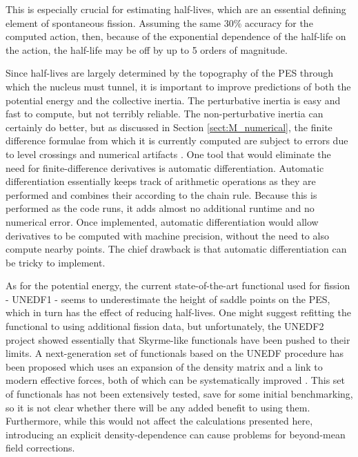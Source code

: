This is especially crucial for estimating half-lives, which are an essential defining element of spontaneous fission. Assuming the same 30\% accuracy for the computed action, then, because of the exponential dependence of the half-life on the action, the half-life may be off by up to 5 orders of magnitude.



Since half-lives are largely determined by the topography of the PES through which the nucleus must tunnel, it is important to improve predictions of both the potential energy and the collective inertia. The perturbative inertia is easy and fast to compute, but not terribly reliable. The non-perturbative inertia can certainly do better, but as discussed in Section \ref{sect:M_numerical}, the finite difference formulae from which it is currently computed are subject to errors due to level crossings and numerical artifacts . One tool that would eliminate the need for finite-difference derivatives is automatic differentiation. Automatic differentiation essentially keeps track of arithmetic operations as they are performed and combines their according to the chain rule. Because this is performed as the code runs, it adds almost no additional runtime and no numerical error. Once implemented, automatic differentiation would allow derivatives to be computed with machine precision, without the need to also compute nearby points. The chief drawback is that automatic differentiation can be tricky to implement.

As for the potential energy, the current state-of-the-art functional used for fission - UNEDF1 - seems to underestimate the height of saddle points on the PES, which in turn has the effect of reducing half-lives. One might suggest refitting the functional to using additional fission data, but unfortunately, the UNEDF2 project \cite{Kortelainen2014} showed essentially that Skyrme-like functionals have been pushed to their limits. A next-generation set of functionals based on the UNEDF procedure has been proposed which uses an expansion of the density matrix and a link to modern effective forces, both of which can be systematically improved \cite{NavarroPerez2018}. This set of functionals has not been extensively tested, save for some initial benchmarking, so it is not clear whether there will be any added benefit to using them. Furthermore, while this would not affect the calculations presented here, introducing an explicit density-dependence can cause problems for beyond-mean field corrections. %

